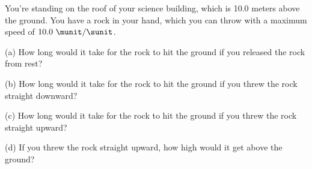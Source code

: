 
You're standing on the roof of your science building, which
is 10.0 meters above the ground. You have a rock in your hand, which
you can throw with a maximum speed of $10.0\ \munit/\sunit$.

(a) How long would it take for the rock to hit the ground if you
released the rock from rest?\answercheck\hwendpart

(b) How long would it take for the rock to hit the ground if you threw
the rock straight downward?\answercheck\hwendpart

(c) How long would it take for the rock to hit the ground if you threw
the rock straight upward?\answercheck\hwendpart

(d) If you threw the rock straight upward, how high would it get
above the ground?\answercheck
